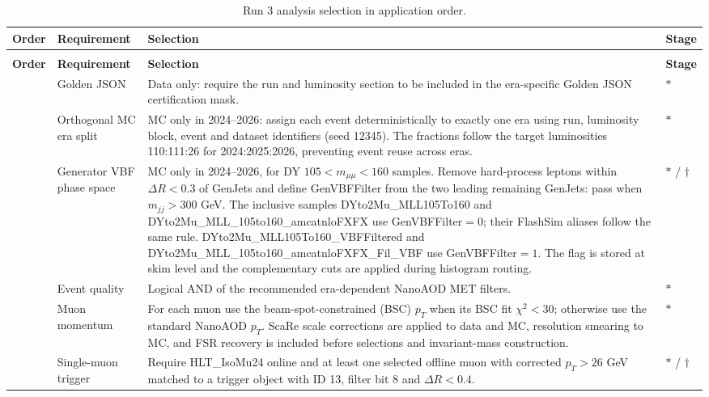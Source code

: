 \begin{longtable}{>{\centering\arraybackslash}p{} >{\raggedright\arraybackslash}p{} >{\raggedright\arraybackslash}p{} >{\centering\arraybackslash}p{}}
\caption{Run 3 analysis selection in application order.}\label{tab:analysis-selection} \\
\toprule
\textbf{Order} & \textbf{Requirement} & \textbf{Selection} & \textbf{Stage} \\
\midrule
\endfirsthead
\multicolumn{4}{c}{\tablename\ \thetable\ -- continued} \\
\toprule
\textbf{Order} & \textbf{Requirement} & \textbf{Selection} & \textbf{Stage} \\
\midrule
\endhead
\bottomrule
\endlastfoot
1 & Golden JSON & Data only: require the run and luminosity section to be included in the era-specific Golden JSON certification mask. & $\ast$ \\
2 & Orthogonal MC era split & MC only in 2024--2026: assign each event deterministically to exactly one era using run, luminosity block, event and dataset identifiers (seed 12345). The fractions follow the target luminosities 110:111:26 for 2024:2025:2026, preventing event reuse across eras. & $\ast$ \\
3 & Generator VBF phase space & MC only in 2024--2026, for DY $105<m_{\mu\mu}<160$ samples. Remove hard-process leptons within $\Delta R<0.3$ of GenJets and define GenVBFFilter from the two leading remaining GenJets: pass when $m_{jj}>300$ GeV. The inclusive samples DYto2Mu\_MLL105To160 and DYto2Mu\_MLL\_105to160\_amcatnloFXFX use GenVBFFilter$=0$; their FlashSim aliases follow the same rule. DYto2Mu\_MLL105To160\_VBFFiltered and DYto2Mu\_MLL\_105to160\_amcatnloFXFX\_Fil\_VBF use GenVBFFilter$=1$. The flag is stored at skim level and the complementary cuts are applied during histogram routing. & $\ast$ / $\dagger$ \\
4 & Event quality & Logical AND of the recommended era-dependent NanoAOD MET filters. & $\ast$ \\
5 & Muon momentum & For each muon use the beam-spot-constrained (BSC) $p_T$ when its BSC fit $\chi^2<30$; otherwise use the standard NanoAOD $p_T$. ScaRe scale corrections are applied to data and MC, resolution smearing to MC, and FSR recovery is included before selections and invariant-mass construction. & $\ast$ \\
6 & Single-muon trigger & Require HLT\_IsoMu24 online and at least one selected offline muon with corrected $p_T>26$ GeV matched to a trigger object with ID 13, filter bit 8 and $\Delta R<0.4$. & $\ast$ / $\dagger$ \\

\end{longtable}

